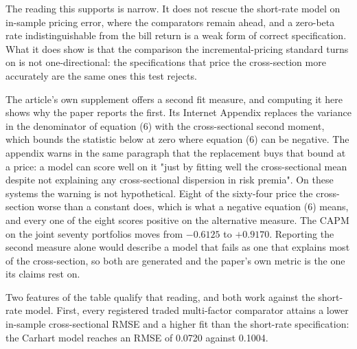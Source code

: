\documentclass[11pt]{article}
\begin{document}
The reading this supports is narrow. It does not rescue the short-rate model on
in-sample pricing error, where the comparators remain ahead, and a zero-beta rate
indistinguishable from the bill return is a weak form of correct specification.
What it does show is that the comparison the incremental-pricing standard turns
on is not one-directional: the specifications that price the cross-section more
accurately are the same ones this test rejects.

The article's own supplement offers a second fit measure, and computing it here
shows why the paper reports the first. Its Internet Appendix replaces the
variance in the denominator of equation (6) with the cross-sectional second %
moment, which bounds the statistic below at zero where equation (6) can be %
negative. The appendix warns in the same paragraph that the replacement buys
that bound at a price: a model can score well on it "just by fitting well the
cross-sectional mean despite not explaining any cross-sectional dispersion in
risk premia". On these systems the warning is not hypothetical. Eight of the
sixty-four price the cross-section worse than a constant does, which is what a %
negative equation (6) means, and every one of the eight scores positive on the %
alternative measure. The CAPM on the joint seventy portfolios moves from %
$-0.6125$ to $+0.9170$. Reporting the second measure alone would describe a %
model that fails as one that explains most of the cross-section, so both are
generated and the paper's own metric is the one its claims rest on.

Two features of the table qualify that reading, and both work against the
short-rate model. First, every registered traded multi-factor comparator attains
a lower in-sample cross-sectional RMSE and a higher fit than the short-rate
specification: the Carhart model reaches an RMSE of 0.0720 against 0.1004. %
\end{document}
